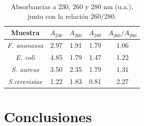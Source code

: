 \documentclass[fleqn,10pt]{SelfArx}
\begin{document}
	\begin{table}[h]
		\centering
		\caption{Absorbancias a 230, 260 y 280 nm (u.a.), junto con la relaci\'on 260/280.}
		\begin{tabular}{c|ccc|c}
			\hline
			\textbf{Muestra} & $A_{230}$ & $A_{260}$ & $A_{280}$ & $A_{260} / A_{280}$ \\
			\hline
			\textit{F. ananassa} & 2.97 & 1.91 & 1.79 & 1.06 \\
			\textit{E. coli} & 4.85 & 1.79 & 1.47 & 1.22 \\
			\textit{S. aureus} & 3.50 & 2.35 & 1.79 & 1.31 \\
			\textit{S.cerevisiae} & 1.22 & 1.83 & 0.81 & 2.27 \\
			\hline
		\end{tabular}
	\end{table}
	\cite{sambrook2001molecular}
\section{Conclusiones}
	



\end{document}
